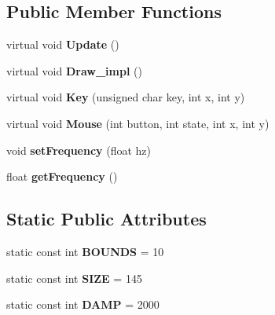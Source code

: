 \subsection*{Public Member Functions}
\begin{DoxyCompactItemize}
\item 
virtual void {\bfseries Update} ()\label{classWaveRenderDemo_1_1Wave_a448dd6150ba6d300f769bfd2333c12df}

\item 
virtual void {\bfseries Draw\-\_\-impl} ()\label{classWaveRenderDemo_1_1Wave_ae18a8e6ce71d7d163296fdd2bff86459}

\item 
virtual void {\bfseries Key} (unsigned char key, int x, int y)\label{classWaveRenderDemo_1_1Wave_af7c5e3c7a86d2c00ca318094fcde7d5b}

\item 
virtual void {\bfseries Mouse} (int button, int state, int x, int y)\label{classWaveRenderDemo_1_1Wave_a329b44cad7fb6b68737b4eddd7648b8f}

\item 
void {\bfseries set\-Frequency} (float hz)\label{classWaveRenderDemo_1_1Wave_a84783bf0e0bbe0e2bc113318850c851d}

\item 
float {\bfseries get\-Frequency} ()\label{classWaveRenderDemo_1_1Wave_a811182abe52b048e2cea3497a0116cb1}

\end{DoxyCompactItemize}
\subsection*{Static Public Attributes}
\begin{DoxyCompactItemize}
\item 
static const int {\bfseries B\-O\-U\-N\-D\-S} = 10\label{classWaveRenderDemo_1_1Wave_ac9d3345cceb19e26c1c00830b3ee92cd}

\item 
static const int {\bfseries S\-I\-Z\-E} = 145\label{classWaveRenderDemo_1_1Wave_a8408192d41391918b7fe2944de58e702}

\item 
static const int {\bfseries D\-A\-M\-P} = 2000\label{classWaveRenderDemo_1_1Wave_adf79d840e1354f89f4a4b95e4b0fd427}

\end{DoxyCompactItemize}
